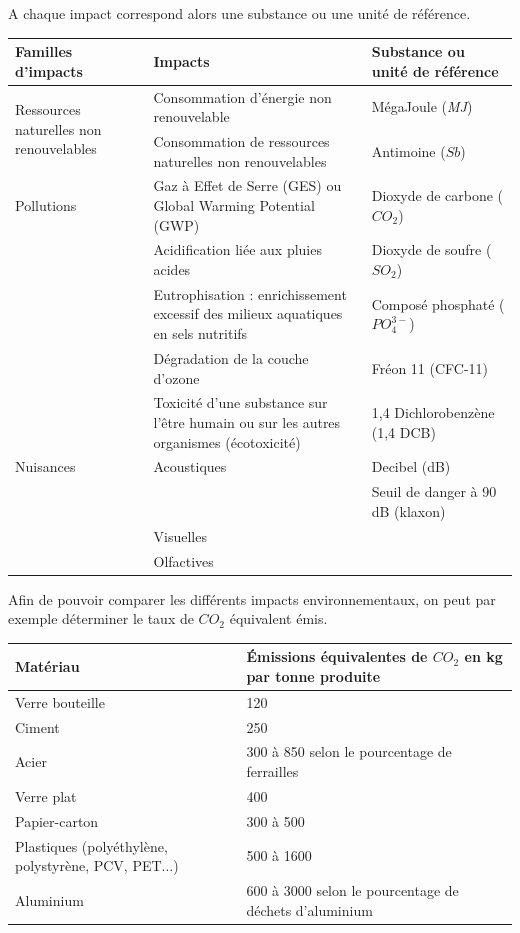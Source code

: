 \documentclass[11pt,oneside]{article}
\begin{document}
A chaque impact correspond alors une substance ou une unité de référence. 

\begin{center}
\begin{tabular}{|p{}|p{}|p{}|}
\hline 
\textbf{Familles d’impacts} & \textbf{Impacts} & \textbf{Substance ou unité de référence} \\ \hline \hline 
\multirow{2}{.2\textwidth}{Ressources naturelles non renouvelables} & 
Consommation d’énergie non renouvelable & 
MégaJoule (\textit{MJ}) \\ \cline{2-3}
& Consommation de ressources naturelles non renouvelables  &
Antimoine ($Sb$) \\ \hline
Pollutions & 
Gaz à Effet de Serre (GES) ou Global Warming Potential (GWP) & 
Dioxyde de carbone ($CO_2$) \\ \cline{2-3}
&
Acidification liée aux pluies acides &
Dioxyde de soufre ($SO_2$) \\ \cline{2-3}
&
Eutrophisation : enrichissement excessif des milieux aquatiques en sels nutritifs &
Composé phosphaté ($PO_4^{3-}$) \\ \cline{2-3}
&
Dégradation de la couche d’ozone &
Fréon 11 (CFC-11) \\ \cline{2-3}
&
Toxicité d’une substance sur l’être humain ou sur les autres organismes (écotoxicité)&
1,4 Dichlorobenzène (1,4 DCB) \\ \hline
Nuisances & 
Acoustiques & 
Decibel (dB) \\
&& Seuil de danger à 90 dB (klaxon) \\ \cline{2-3}
& Visuelles & \\ \cline{2-3}
& Olfactives & \\
\hline
\end{tabular}
\end{center}

Afin de pouvoir comparer les différents impacts environnementaux, on peut par exemple déterminer le taux de $CO_2$ équivalent émis. 

\begin{center}
\begin{tabular}{|l|l|}
\hline
\textbf{Matériau} & \textbf{Émissions équivalentes de $CO_2$ en kg par tonne produite} \\ \hline \hline
Verre bouteille & 120 \\ \hline
Ciment & 250 \\ \hline
Acier & 300 à 850 selon le pourcentage de ferrailles \\ \hline
Verre plat & 400 \\ \hline
Papier-carton & 300 à 500 \\ \hline
Plastiques (polyéthylène, polystyrène, PCV, PET...)  & 500 à 1600 \\ \hline
Aluminium & 600 à 3000 selon le pourcentage de déchets d'aluminium \\ \hline
\end{tabular}
\end{center}
\end{document}
